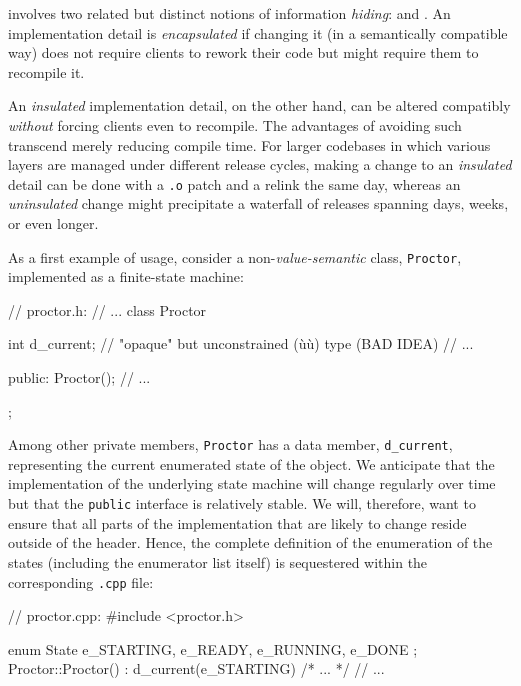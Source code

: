  involves two related but distinct notions of
information \emph{hiding}:  and .
An implementation detail is \emph{encapsulated} if changing it (in a
semantically compatible way) does not require clients to rework their
code but might require them to recompile it.

An \emph{insulated} implementation detail, on the other hand, can be
altered compatibly \emph{without} forcing clients even to recompile.
The advantages of avoiding such  transcend
merely reducing compile time. For larger codebases in which various
layers are managed under different release cycles, making a change to an
\emph{insulated} detail can be done with a \lstinline!.o! patch and a
relink the same day, whereas an \emph{uninsulated} change might
precipitate a waterfall of releases spanning days, weeks, or even
longer.

As a first example of  usage, consider a
non-\emph{value-semantic}  class, \lstinline!Proctor!,
implemented as a finite-state machine:

\begin{emcppslisting}[emcppsbatch=e2]
// proctor.h:
// ...
class Proctor
{
    int d_current;  // "opaque" but unconstrained (ù{}ù) type (BAD IDEA)
    // ...

public:
    Proctor();
    // ...
};
\end{emcppslisting}

\noindent Among other private members, \lstinline!Proctor! has a data member,
\lstinline!d_current!, representing the current enumerated state of
the object. We anticipate that the implementation of the underlying
state machine will change regularly over time but that the
\lstinline!public! interface is relatively stable. We will, therefore, want
to ensure that all parts of the implementation that are likely to change
reside outside of the header. Hence, the complete definition of the
enumeration of the states (including the enumerator list itself) is
sequestered within the corresponding \lstinline!.cpp! file:

\begin{emcppslisting}[emcppsbatch=e2]
// proctor.cpp:
#include <proctor.h>

enum State { e_STARTING, e_READY, e_RUNNING, e_DONE };
Proctor::Proctor() : d_current(e_STARTING) { /* ... */ }
// ...
\end{emcppslisting}

